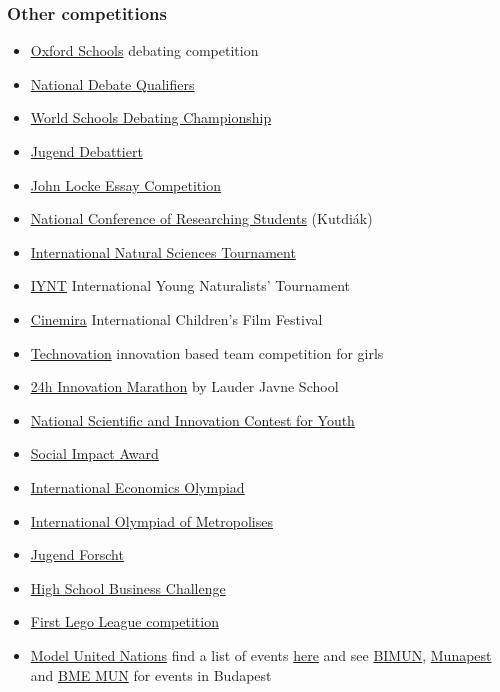 \documentclass{article}
\begin{document}
\subsubsection{Other competitions}

\begin{itemize}
    \item \href{https://www.oxfordschools.net/}{Oxford Schools} debating competition
    \item \href{https://milestone-institute.org/student-life/debate/}{National Debate Qualifiers}
    \item \href{https://wsdcdebate.org/about-wsdc}{World Schools Debating Championship}
    \item \href{https://www.jugend-debattiert.eu/}{Jugend Debattiert}
    \item \href{https://www.johnlockeinstitute.com/essay-competition}{John Locke Essay Competition}
    \item \href{https://www.kutdiak.hu/en/events/}{National Conference of Researching Students} (Kutdiák)
    \item \href{https://scitourn.com/}{International Natural Sciences Tournament}
    \item \href{http://iynt.org/}{IYNT} International Young Naturalists' Tournament
    \item \href{https://www.kidfilmfestival.hu/en/}{Cinemira} International Children's Film Festival
    \item \href{https://technovationchallenge.org/}{Technovation} innovation based team competition for girls
    \item \href{https://lim.lauder.hu/}{24h Innovation Marathon} by Lauder Javne School
    \item \href{https://www.innovacio.hu/en_3a.htm}{National Scientific and Innovation Contest for Youth}
    \item \href{https://hungary.socialimpactaward.net/en/}{Social Impact Award}
    \item \href{https://ecolymp.org/}{International Economics Olympiad}
    \item \href{http://megapolis.educom.ru/en}{International Olympiad of Metropolises}
    \item \href{https://www.jugend-forscht.de/}{Jugend Forscht}
    \item \href{https://businessismore.eu/}{High School Business Challenge}
    \item \href{https://www.firstlegoleague.org/}{First Lego League competition}
    \item \href{https://en.wikipedia.org/wiki/Model_United_Nations}{Model United Nations} find a list of events \href{https://mymun.com/}{here} and see \href{https://www.bimun.hu/}{BIMUN}, \href{http://munapest.com/}{Munapest} and \href{https://www.mun.bme.hu/}{BME MUN} for events in Budapest

\end{itemize}
\end{document}
